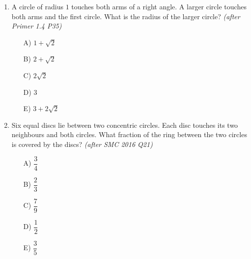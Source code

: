 \documentclass[11pt,a4paper]{article}
\begin{document}
\begin{enumerate}
\item \begin{minipage}[t]{0.60\linewidth}
A circle of radius $1$ touches both arms of a right angle. A larger circle touches both arms and the first circle. What is the radius of the larger circle? \textit{\small(after Primer 1.4 P35)}
\begin{itemize}
\item[A)] $1+\sqrt2$
\item[B)] $2+\sqrt2$
\item[C)] $2\sqrt2$
\item[D)] $3$
\item[E)] $3+2\sqrt2$
\end{itemize}
\end{minipage}\hfill
\begin{minipage}[t]{0.36\linewidth}
\vspace{0pt}
\centering
{}
\end{minipage}


\item \begin{minipage}[t]{0.60\linewidth}
Six equal discs lie between two concentric circles. Each disc touches its two neighbours and both circles. What fraction of the ring between the two circles is covered by the discs? \textit{\small(after SMC 2016 Q21)}
\begin{itemize}[itemsep=3pt]
\item[A)] $\dfrac34$
\item[B)] $\dfrac23$
\item[C)] $\dfrac79$
\item[D)] $\dfrac12$
\item[E)] $\dfrac35$
\end{itemize}
\end{minipage}\hfill
\begin{minipage}[t]{0.36\linewidth}
\vspace{0pt}
\centering
{}
\end{minipage}


\end{enumerate}
\end{document}
